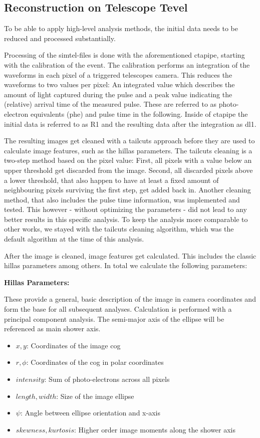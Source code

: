 \subsection{Reconstruction on Telescope Tevel}
\label{sec:tel_analysis}

To be able to apply high-level analysis methods, the initial data 
needs to be reduced and processed substantially.

Processing of the simtel-files is done with the aforementioned ctapipe, starting with 
the calibration of the event. The calibration performs an integration of the waveforms in 
each pixel of a triggered telescopes camera. 
This reduces the waveforms to two values per pixel: An integrated value which describes 
the amount of light captured during the pulse and a peak value indicating the 
(relative) arrival time of the measured pulse. These are referred to as 
photo-electron equivalents (phe) and pulse time in the following.
Inside of ctapipe the initial data is referred to as R1
and the resulting data after the integration as dl1.

The resulting images get cleaned with a tailcuts approach before they are
used to calculate image features, such as the hillas parameters.
The tailcuts cleaning is a two-step method based on the pixel value:
First, all pixels with a value below an upper threshold get discarded from 
the image. Second, all discarded pixels above a lower threshold, that also 
happen to have at least a fixed amount of neighbouring pixels surviving the first step,
get added back in.
Another cleaning method, that also includes the pulse time information, 
was implemented and tested. This however
- without optimizing the parameters - did not lead to any better results in this
specific analysis.
To keep the analysis more comparable to other works, we stayed with 
the tailcuts cleaning algorithm, which was the default algorithm at the time 
of this analysis.

After the image is cleaned, image features get calculated.
This includes the classic hillas parameters among others.
In total we calculate the following parameters:

\textbf{Hillas Parameters:}

These provide a general, basic description of the image 
in camera coordinates and form the base for 
all subsequent analyses. Calculation is performed with a
principal component analysis. The semi-major axis of the ellipse
will be referenced as main shower axis.

\begin{itemize}
    \item{$x, y$: Coordinates of the image cog}
    \item{$r, \phi$: Coordinates of the cog in polar coordinates}
    \item{$intensity$: Sum of photo-electrons across all pixels}
    \item{$length, width$: Size of the image ellipse}
    \item{$\psi$: Angle between ellipse orientation and x-axis}
    \item{$skewness, kurtosis$: Higher order image moments along the shower axis}
\end{itemize}

